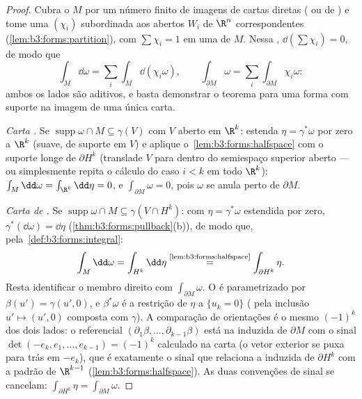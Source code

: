 \begin{proof}
Cubra o  $M$ por um número finito de imagens de cartas
diretas ( ou de ) e tome uma  $(\chi_i)$
subordinada aos abertos $W_i$ de $\R^n$ correspondentes
(\cref{lem:b3:forms:partition}), com $\sum\chi_i
= 1$ em uma  de $M$. Nessa
, $\dd(\sum\chi_i) = 0$, de modo que
\[
\int_M\dd\omega = \sum_i\int_M\dd(\chi_i\omega),
\qquad
\int_{\partial M}\omega =
\sum_i\int_{\partial M}\chi_i\omega :
\]
ambos os lados são aditivos, e basta demonstrar o teorema para uma forma
com suporte na imagem de uma única carta.

\emph{Carta .} Se $\operatorname{supp}\omega \cap M
\subseteq \gamma(V)$ com $V$ aberto em $\R^k$:
estenda $\eta =
\gamma^*\omega$ por zero a $\R^k$ (suave, de suporte  em
$V$) e aplique o~\cref{lem:b3:forms:halfspace} com o suporte longe de $\partial H^k$
(translade $V$ para dentro do semiespaço superior aberto --- ou
simplesmente repita o cálculo do caso $i < k$ em todo $\R^k$):
$\int_M\dd\omega =
\int_{\R^k}\dd\eta = 0$, e $\int_{\partial M}\omega = 0$, pois $\omega$ se anula perto de $\partial M$.

\emph{Carta de .} Se $\operatorname{supp}\omega\cap M
\subseteq \gamma(V \cap H^k)$: com $\eta = \gamma^*\omega$ estendida por zero, $\gamma^*(\dd\omega) = \dd\eta$
(\cref{thm:b3:forms:pullback}(b)), de modo que, pela~\cref{def:b3:forms:integral}:
\[
\int_M\dd\omega = \int_{H^k}\dd\eta
\overset{\text{\cref{lem:b3:forms:halfspace}}}{=}
\int_{\partial H^k}\eta .
\]
Resta identificar o membro direito com $\int_{\partial
M}\omega$. O  é parametrizado por
$\beta(u') =
\gamma(u', 0)$, e $\beta^*\omega$ é a restrição de $\eta$ a $\{u_k = 0\}$ ( pela inclusão
$u'
\mapsto (u', 0)$ composta com $\gamma$). A comparação de orientações é o mesmo
$(-1)^k$ dos dois lados: o referencial $(\partial_1\beta, \dots, \partial_{k-1}\beta)$ está na 
induzida de $\partial M$ com o sinal $\det(-e_k, e_1, \dots, e_{k-1}) = (-1)^k$ calculado na carta (o vetor exterior
se puxa para trás em $-e_k$), que é exatamente o sinal que relaciona
a  induzida de $\partial H^k$ com a padrão de $\R^{k-1}$
(\cref{lem:b3:forms:halfspace}). As duas convenções de sinal se cancelam: $\int_{\partial H^k}\eta = \int_{\partial M}\omega$.
\end{proof}


